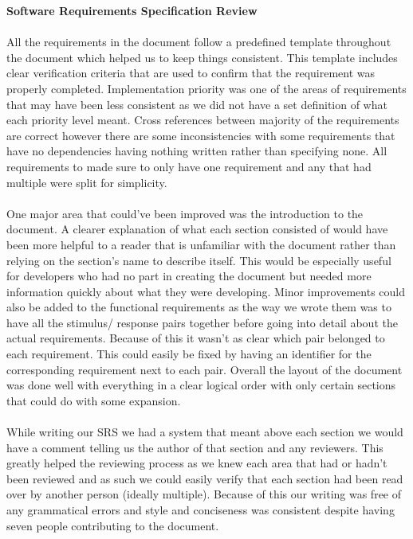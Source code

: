 \documentclass[11pt, a4paper]{article}
\begin{document}
	
	\begin{center}
		\huge \bf Software Requirements Specification Review
	\end{center}
	
	\paragraph{} {All the requirements in the document follow a predefined template throughout the document which helped us to keep things consistent. This template includes clear verification criteria that are used to confirm that the requirement was properly completed. Implementation priority was one of the areas of requirements that may have been less consistent as we did not have a set definition of what each priority level meant.  Cross references between majority of the requirements are correct however there are some inconsistencies with some requirements that have no dependencies having nothing written rather than specifying none. All requirements to made sure to only have one requirement and any that had multiple were split for simplicity.}
	\paragraph{} {One major area that could’ve been improved was the introduction to the document. A clearer explanation of what each section consisted of would have been more helpful to a reader that is unfamiliar with the document rather than relying on the section’s name to describe itself. This would be especially useful for developers who had no part in creating the document but needed more information quickly about what they were developing. Minor improvements could also be added to the functional requirements as the way we wrote them was to have all the stimulus/ response pairs together before going into detail about the actual requirements. Because of this it wasn’t as clear which pair belonged to each requirement. This could easily be fixed by having an identifier for the corresponding requirement next to each pair. Overall the layout of the document was done well with everything in a clear logical order with only certain sections that could do with some expansion.}
	\paragraph{} {While writing our SRS we had a system that meant above each section we would have a comment telling us the author of that section and any reviewers. This greatly helped the reviewing process as we knew each area that had or hadn’t been reviewed and as such we could easily verify that each section had been read over by another person (ideally multiple). Because of this our writing was free of any grammatical errors and style and conciseness was consistent despite having seven people contributing to the document. }
\end{document}
